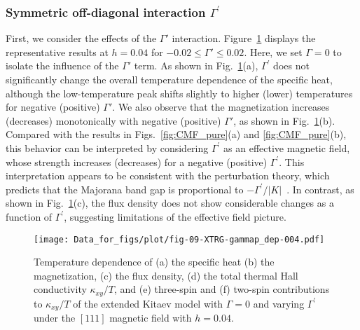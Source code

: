 \documentclass[twocolumn,superscriptaddress,showpacs, longbibliography, aps, prx]{revtex4-2}
\begin{document}
\subsubsection{Symmetric off-diagonal interaction $\Gamma^{\prime}$}\label{subsec:Gamma_prime}
First, we consider the effects of the $\Gamma'$ interaction. 
Figure~\ref{fig:all_h0.04_Gp} displays the representative results at $h=0.04$ for $-0.02 \leq \Gamma' \leq 0.02$. 
Here, we set $\Gamma = 0$ to isolate the influence of the $\Gamma'$ term. 
As shown in Fig.~\ref{fig:all_h0.04_Gp}(a), $\Gamma^{\prime}$ does not significantly change 
the overall temperature dependence of the specific heat, although the low-temperature peak
shifts slightly to higher (lower) temperatures for negative (positive) $\Gamma'$. 
We also observe that the magnetization increases (decreases) monotonically with negative (positive) $\Gamma'$, as shown in Fig.~\ref{fig:all_h0.04_Gp}(b).
Compared with the results in Figs.~\ref{fig:CMF_pure}(a) and \ref{fig:CMF_pure}(b), this behavior can be interpreted by considering $\Gamma^{\prime}$ as an effective magnetic field, whose strength increases (decreases) for a negative (positive)  $\Gamma^{\prime}$. 
This interpretation appears to be consistent with the perturbation theory, which predicts that the Majorana band gap is proportional to $-\Gamma^{\prime}/|K|$~\cite{TakikawaF2020}. 
In contrast, as shown in Fig.~\ref{fig:all_h0.04_Gp}(c), the flux density does not show considerable changes as a function of $\Gamma^{\prime}$, suggesting limitations of the effective field picture.

\begin{figure}
  \begin{center}
    \texttt{[image: Data\_for\_figs/plot/fig-09-XTRG-gammap\_dep-004.pdf]}
  \end{center}
  \caption{Temperature dependence of (a) the specific heat (b) the magnetization, (c) the flux density, 
   (d) the total thermal Hall conductivity $\kappa_{xy}/T$, and
   (e) three-spin and (f) two-spin contributions to $\kappa_{xy}/T$ of the extended Kitaev model with $\Gamma=0$ and varying $\Gamma^{\prime}$ under the $[111]$ magnetic field with $h=0.04$.
  }
  \label{fig:all_h0.04_Gp}
\end{figure}
\end{document}
